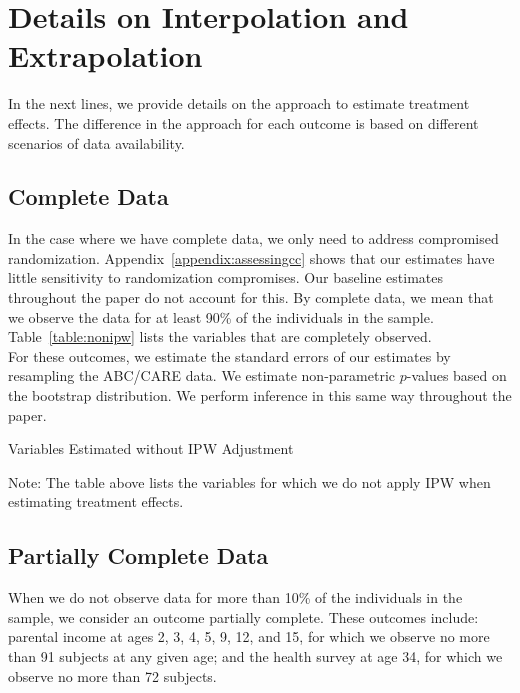 \section{Details on Interpolation and Extrapolation} \label{appendix:methodology}

\noindent In the next lines, we provide details on the approach to estimate treatment effects. The difference in the approach for each outcome is based on different scenarios of data availability.

\subsection{Complete Data}
\label{app:method_fullobs}

\noindent  In the case where we have complete data, we only need to address compromised randomization. Appendix~\ref{appendix:assessingcc} shows that our estimates have little sensitivity to randomization compromises. Our baseline estimates throughout the paper do not account for this. By complete data, we mean that we observe the data for at least 90\% of the individuals in the sample. Table~\ref{table:nonipw} lists the variables that are completely observed.\\

\noindent For these outcomes, we estimate the standard errors of our estimates by resampling the ABC/CARE data. We estimate non-parametric $p$-values based on the bootstrap distribution. We perform inference in this same way throughout the paper.

\begin{table}[H]
\begin{threeparttable}
\caption{Variables Estimated without IPW Adjustment}
\label{table:nonipw}
\centering

\begin{tablenotes}
\footnotesize
\item Note: The table above lists the variables for which we do not apply IPW when estimating
treatment effects.
\end{tablenotes}
\end{threeparttable}
\end{table}

\subsection{Partially Complete Data}
\label{app:method_partialobs}

\noindent When we do not observe data for more than 10\% of the individuals in the sample, we consider an outcome partially complete. These outcomes include: parental income at ages 2, 3, 4, 5, 9, 12, and 15, for which we observe no more than 91 subjects at any given age; and the health survey at age 34, for which we observe no more than 72 subjects.\\

